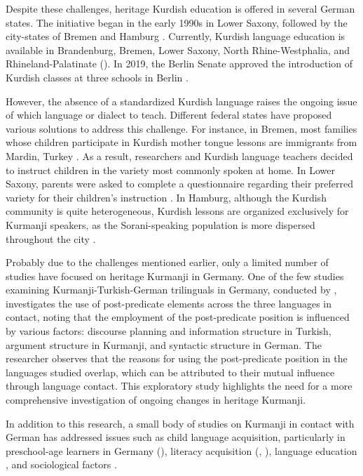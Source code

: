 \newpage
Despite these challenges, heritage Kurdish education is offered in several German states. The initiative began in the early 1990s in Lower Saxony, followed by the city-states of Bremen and Hamburg \citep{Schmidt2000}. Currently, Kurdish language education is available in Brandenburg, Bremen, Lower Saxony, North Rhine-Westphalia, and Rhineland-Palatinate (\citealt{Mediendienst2019}). In 2019, the Berlin Senate approved the introduction of Kurdish classes at three schools in Berlin \citep{Derince2022}.

However, the absence of a standardized Kurdish language raises the ongoing issue of which language or dialect to teach. Different federal states have proposed various solutions to address this challenge. For instance, in Bremen, most families whose children participate in Kurdish mother tongue lessons are immigrants from Mardin, Turkey \citep{Schmidt2000}. As a result, researchers and Kurdish language teachers decided to instruct children in the variety most commonly spoken at home. In Lower Saxony, parents were asked to complete a questionnaire regarding their preferred variety for their children's instruction \citep{Schmidt2000}. In Hamburg, although the Kurdish community is quite heterogeneous, Kurdish lessons are organized exclusively for Kurmanji speakers, as the Sorani-speaking population is more dispersed throughout the city \citep{Schmidt2000}.

Probably due to the challenges mentioned earlier, only a limited number of studies have focused on heritage Kurmanji in Germany. One of the few studies examining Kurmanji-Turkish-German trilinguals in Germany, conducted by \citet{Herkenrath2021}, investigates the use of post-predicate elements across the three languages in contact, noting that the employment of the post-predicate position is influenced by various factors: discourse planning and information structure in Turkish, argument structure in Kurmanji, and syntactic structure in German. The researcher observes that the reasons for using the post-predicate position in the languages studied overlap, which can be attributed to their mutual influence through language contact. This exploratory study highlights the need for a more comprehensive investigation of ongoing changes in heritage Kurmanji.

In addition to this research, a small body of studies on Kurmanji in contact with German has addressed issues such as child language acquisition, particularly in preschool-age learners in Germany (\citealt{Kirgiz2022}), literacy acquisition (\citealt{Simsek2016}, \citealt{CorvachoEtAl2021}), language education \citep{Derince2022}, and sociological factors \citep{Eccarius2019}.

